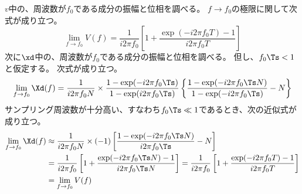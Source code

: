             $v$中の、周波数が$f_0$である成分の振幅と位相を調べる。
            $f\to f_0$の極限に関して次式が成り立つ。
            \[ \lim_{f\to f_0} V(f) = \frac{1}{i2\pi f_0}\left[1 + \frac{\exp(-i 2\pi f_0 T)-1}{i 2\pi f_0 T}\right] \]
            次に$\xd$中の、周波数が$f_0$である成分の振幅と位相を調べる。
            但し、$f_0\Ts < 1$と仮定する。
            次式が成り立つ。
            \[ \lim_{f\to f_0} \Xd(f) = \frac{1}{i 2\pi f_0 N}\times\frac{1-\exp(-i 2\pi f_0\Ts)}{1-\exp(i 2\pi f_0\Ts)}\left\{\frac{1-\exp(-i 2\pi f_0 \Ts N)}{1-\exp(-i 2\pi f_0 \Ts)} - N\right\} \]
            サンプリング周波数が十分高い、すなわち$f_0\Ts\ll 1$であるとき、次の近似式が成り立つ。
            \begin{align*}
                \lim_{f\to f_0} \Xd(f) &\approx \frac{1}{i 2\pi f_0 N}\times(-1)\left[\frac{1-\exp(-i 2\pi f_0 \Ts N)}{i 2\pi f_0 \Ts} - N\right] \\
                &= \frac{1}{i 2\pi f_0}\left[1 + \frac{\exp(-i 2\pi f_0 \Ts N)-1}{i 2\pi f_0 \Ts N}\right] = \frac{1}{i 2\pi f_0}\left[1 + \frac{\exp(-i 2\pi f_0 T)-1}{i 2\pi f_0 T}\right] \\
                &=  \lim_{f\to f_0} V(f)
            \end{align*}

